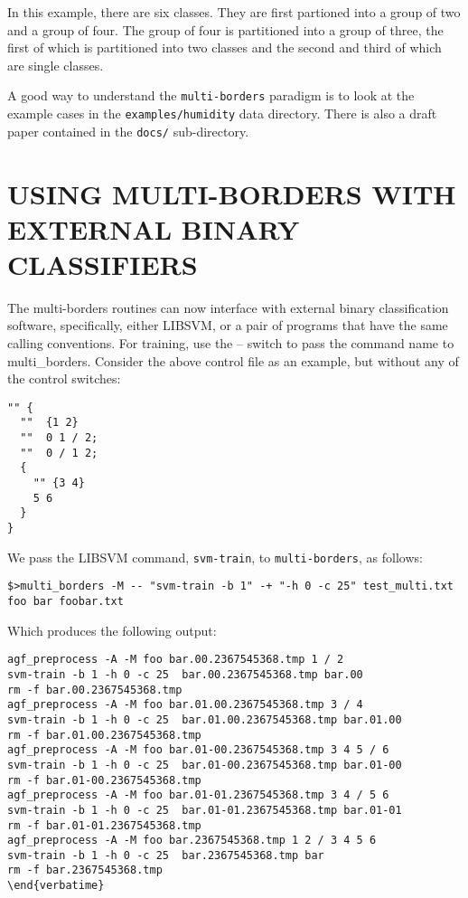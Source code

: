 \documentclass[12pt]{article}
\begin{document}
\begin{list}
  In this example, there are six classes.  They are first partioned into a group of two and a group of four.  The group of four is partitioned into a group of three, the first of which is partitioned into two classes and the second and third of which are single classes.  

A good way to understand the \verb"multi-borders" paradigm is to look at the example cases in the \verb"examples/humidity" data directory.  There is also a draft paper contained in the \verb"docs/" sub-directory.


\section{USING MULTI-BORDERS WITH EXTERNAL BINARY CLASSIFIERS}

The multi-borders routines can now interface with external binary classification software, specifically, either LIBSVM, or a pair of programs that have the same calling conventions.  For training, use the -- switch to pass the command name to multi_borders.  Consider the above control file as an example, but without any of the control switches:

\begin{verbatim}
"" {
  ""  {1 2}
  ""  0 1 / 2;
  ""  0 / 1 2;
  {
    "" {3 4}
    5 6
  } 
} 
\end{verbatim}

We pass the LIBSVM command, \verb"svm-train", to \verb"multi-borders", as follows:

\begin{verbatim}
$>multi_borders -M -- "svm-train -b 1" -+ "-h 0 -c 25" test_multi.txt foo bar foobar.txt
\end{verbatim}

Which produces the following output:

\begin{verbatim}
agf_preprocess -A -M foo bar.00.2367545368.tmp 1 / 2
svm-train -b 1 -h 0 -c 25  bar.00.2367545368.tmp bar.00
rm -f bar.00.2367545368.tmp
agf_preprocess -A -M foo bar.01.00.2367545368.tmp 3 / 4
svm-train -b 1 -h 0 -c 25  bar.01.00.2367545368.tmp bar.01.00
rm -f bar.01.00.2367545368.tmp
agf_preprocess -A -M foo bar.01-00.2367545368.tmp 3 4 5 / 6
svm-train -b 1 -h 0 -c 25  bar.01-00.2367545368.tmp bar.01-00
rm -f bar.01-00.2367545368.tmp
agf_preprocess -A -M foo bar.01-01.2367545368.tmp 3 4 / 5 6
svm-train -b 1 -h 0 -c 25  bar.01-01.2367545368.tmp bar.01-01
rm -f bar.01-01.2367545368.tmp
agf_preprocess -A -M foo bar.2367545368.tmp 1 2 / 3 4 5 6
svm-train -b 1 -h 0 -c 25  bar.2367545368.tmp bar
rm -f bar.2367545368.tmp
\end{verbatime}


\end{verbatim}
\end{list}
\end{document}

